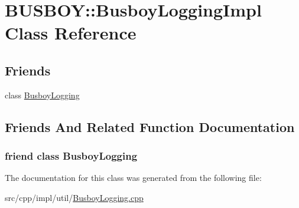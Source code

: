 \hypertarget{classBUSBOY_1_1BusboyLoggingImpl}{
\section{BUSBOY::BusboyLoggingImpl Class Reference}
\label{classBUSBOY_1_1BusboyLoggingImpl}
}
\subsection*{Friends}
\begin{DoxyCompactItemize}
\item 
class \hyperlink{classBUSBOY_1_1BusboyLoggingImpl_a0ec4e0007373aca9cfa45e48bb2e4655}{BusboyLogging}
\end{DoxyCompactItemize}


\subsection{Friends And Related Function Documentation}
\hypertarget{classBUSBOY_1_1BusboyLoggingImpl_a0ec4e0007373aca9cfa45e48bb2e4655}{
\subsubsection[{BusboyLogging}]{\setlength{\rightskip}{0pt plus 5cm}friend class {\bf BusboyLogging}}}
\label{classBUSBOY_1_1BusboyLoggingImpl_a0ec4e0007373aca9cfa45e48bb2e4655}


The documentation for this class was generated from the following file:\begin{DoxyCompactItemize}
\item 
src/cpp/impl/util/\hyperlink{BusboyLogging_8cpp}{BusboyLogging.cpp}\end{DoxyCompactItemize}
